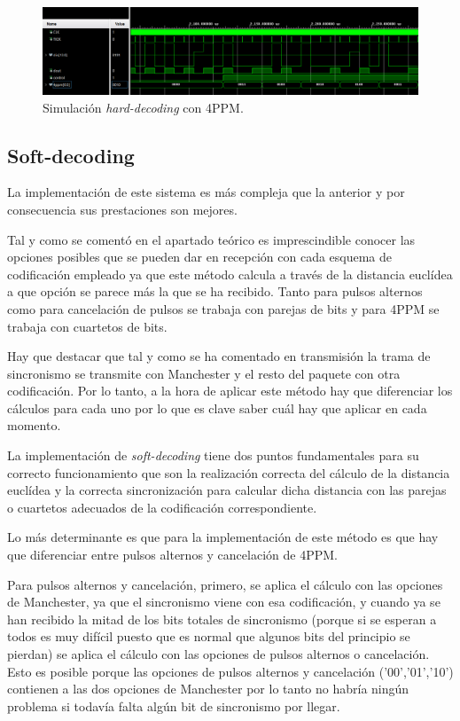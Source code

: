 \begin{figure}[ht]
    \centering
    \includegraphics[scale=0.4]{./figuras/sim_hard_4ppm.png}
    \caption{\small{Simulación \textit{hard-decoding} con 4PPM.}}
    \label{sim_hard_4ppm}%
\end{figure}

\subsection{Soft-decoding}
La implementación de este sistema es más compleja que la anterior y por consecuencia
sus prestaciones son mejores.

Tal y como se comentó en el apartado teórico es imprescindible conocer las opciones 
posibles que se pueden dar en recepción con cada esquema de codificación empleado ya que
este método calcula a través de la distancia euclídea a que opción se parece más la 
que se ha recibido. Tanto para pulsos alternos como para cancelación de pulsos se 
trabaja con parejas de bits y para 4PPM se trabaja con cuartetos de bits.

Hay que destacar que tal y como se ha comentado en transmisión la trama de sincronismo
se transmite con Manchester y el resto del paquete con otra codificación. Por lo tanto,
a la hora de aplicar este método hay que diferenciar los cálculos para cada uno por lo 
que es clave saber cuál hay que aplicar en cada momento.

La implementación de \textit{soft-decoding} tiene dos puntos fundamentales para su 
correcto funcionamiento que son la realización correcta del cálculo de la distancia
euclídea y la correcta sincronización para calcular dicha distancia con las parejas o
cuartetos adecuados de la codificación correspondiente.

Lo más determinante es que para la implementación de este método es que hay 
que diferenciar entre pulsos alternos y cancelación de 4PPM.

Para pulsos alternos y cancelación, primero,
se aplica el cálculo con las opciones de Manchester, ya que el sincronismo viene con esa 
codificación, y cuando ya se han recibido la mitad de los bits totales de sincronismo 
(porque si se esperan a todos es muy difícil puesto que es normal que algunos bits del
principio se pierdan) se aplica el cálculo con las opciones de pulsos alternos o 
cancelación. Esto es posible porque las opciones de pulsos alternos y cancelación 
('00','01','10') contienen a las dos opciones de Manchester por lo tanto no habría
ningún problema si todavía falta algún bit de sincronismo por llegar. \label{xx}

